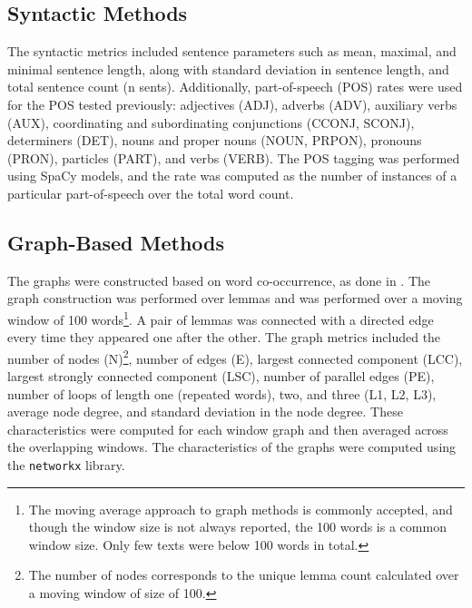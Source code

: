 \subsection{Syntactic Methods}
The syntactic metrics included sentence parameters such as mean, maximal, and minimal sentence length, along with standard deviation in sentence length, and total sentence count (n sents). Additionally, part-of-speech (POS) rates were used for the POS tested previously: adjectives (ADJ), adverbs (ADV), auxiliary verbs (AUX), coordinating and subordinating conjunctions (CCONJ, SCONJ), determiners (DET), nouns and proper nouns (NOUN, PRPON), pronouns (PRON), particles (PART), and verbs (VERB). The POS tagging was performed using SpaCy models, and the rate was computed as the number of instances of a particular part-of-speech over the total word count.

\subsection{Graph-Based Methods}
The graphs were constructed based on word co-occurrence, as done in \citet{mota2012speech}. The graph construction was performed over lemmas and was performed over a moving window of 100 words\footnote{The moving average approach to graph methods is commonly accepted, and though the window size is not always reported, the 100 words is a common window size. Only few texts were below 100 words in total.}. A pair of lemmas was connected with a directed edge every time they appeared one after the other. The graph metrics included the number of nodes (N)\footnote{The number of nodes corresponds to the unique lemma count calculated over a moving window of size of 100.}, number of edges (E), largest connected component (LCC), largest strongly connected component (LSC), number of parallel edges (PE), number of loops of length one (repeated words), two, and three (L1, L2, L3), average node degree, and standard deviation in the node degree. These characteristics were computed for each window graph and then averaged across the overlapping windows. The characteristics of the graphs were computed using the \texttt{networkx} library.

